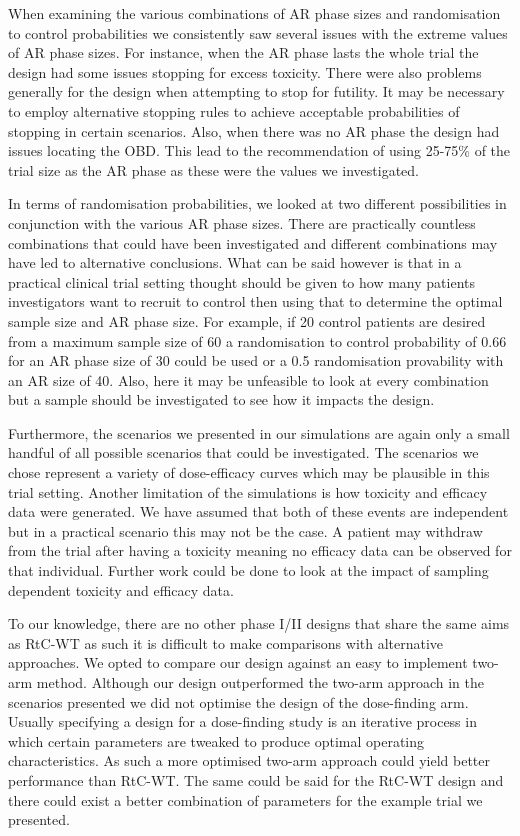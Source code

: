 When examining the various combinations of AR phase sizes and randomisation to control probabilities we consistently saw several issues with the extreme values of AR phase sizes. For instance, when the AR phase lasts the whole trial the design had some issues stopping for excess toxicity. There were also problems generally for the design when attempting to stop for futility. It may be necessary to employ alternative stopping rules to achieve acceptable probabilities of stopping in certain scenarios. Also, when there was no AR phase the design had issues locating the OBD. This lead to the recommendation of using 25-75\% of the trial size as the AR phase as these were the values we investigated. 

In terms of randomisation probabilities, we looked at two different possibilities in conjunction with the various AR phase sizes. There are practically countless combinations that could have been investigated and different combinations may have led to alternative conclusions. What can be said however is that in a practical clinical trial setting thought should be given to how many patients investigators want to recruit to control then using that to determine the optimal sample size and AR phase size. For example, if 20 control patients are desired from a maximum sample size of 60 a randomisation to control probability of 0.66 for an AR phase size of 30 could be used or a 0.5 randomisation provability with an AR size of 40. Also, here it may be unfeasible to look at every combination but a sample should be investigated to see how it impacts the design. 

Furthermore, the scenarios we presented in our simulations are again only a small handful of all possible scenarios that could be investigated. The scenarios we chose represent a variety of dose-efficacy curves which may be plausible in this trial setting. Another limitation of the simulations is how toxicity and efficacy data were generated. We have assumed that both of these events are independent but in a practical scenario this may not be the case. A patient may withdraw from the trial after having a toxicity meaning no efficacy data can be observed for that individual. Further work could be done to look at the impact of sampling dependent toxicity and efficacy data. 

To our knowledge, there are no other phase \RN{1}/\RN{2} designs that share the same aims as RtC-WT as such it is difficult to make comparisons with alternative approaches. We opted to compare our design against an easy to implement two-arm method. Although our design outperformed the two-arm approach in the scenarios presented we did not optimise the design of the dose-finding arm. Usually specifying a design for a dose-finding study is an iterative process in which certain parameters are tweaked to produce optimal operating characteristics. As such a more optimised two-arm approach could yield better performance than RtC-WT. The same could be said for the RtC-WT design and there could exist a better combination of parameters for the example trial we presented. 

